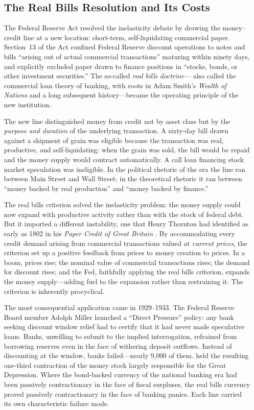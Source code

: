 \documentclass[12pt]{article}
\begin{document}
\subsection{The Real Bills Resolution and Its Costs}

The Federal Reserve Act resolved the inelasticity debate by drawing
the money--credit line at a new location: short-term, self-liquidating
commercial paper.  Section~13 of the Act confined Federal Reserve
discount operations to notes and bills ``arising out of actual
commercial transactions'' maturing within ninety days, and explicitly
excluded paper drawn to finance positions in ``stocks, bonds, or other
investment securities.''  The so-called \emph{real bills doctrine}---
also called the commercial loan theory of banking, with roots in Adam
Smith's \textit{Wealth of Nations} and a long subsequent
history---became the operating principle of the new institution.

The new line distinguished money from credit not by asset class but
by the \emph{purpose and duration} of the underlying transaction.  A
sixty-day bill drawn against a shipment of grain was eligible because
the transaction was real, productive, and self-liquidating: when the
grain was sold, the bill would be repaid and the money supply would
contract automatically.  A call loan financing stock market speculation
was ineligible.  In the political rhetoric of the era the line ran
between Main Street and Wall Street; in the theoretical rhetoric it
ran between ``money backed by real production'' and ``money backed
by finance.''

The real bills criterion solved the inelasticity problem: the money
supply could now expand with productive activity rather than with the
stock of federal debt.  But it imported a different instability, one
that Henry Thornton had identified as early as 1802 in his
\textit{Paper Credit of Great Britain} \citep{Thornton1802}.  By
accommodating every credit demand arising from commercial transactions
valued at \emph{current prices}, the criterion set up a positive
feedback from prices to money creation to prices.  In a boom, prices
rise; the nominal value of commercial transactions rises; the demand for
discount rises; and the Fed, faithfully applying the real bills
criterion, expands the money supply---adding fuel to the expansion
rather than restraining it.  The criterion is inherently procyclical.

The most consequential application came in 1929--1933.  The Federal
Reserve Board member Adolph Miller launched a ``Direct Pressure'' policy:
any bank seeking discount window relief had to certify that it had never
made speculative loans.  Banks, unwilling to submit to the implied
interrogation, refrained from borrowing reserves even in the face of
withering deposit outflows.  Instead of discounting at the window, banks
failed---nearly 9{,}000 of them.  \citet{FriedmanSchwartz1963} held
the resulting one-third contraction of the money stock largely
responsible for the Great Depression.  Where the bond-backed currency
of the national banking era had been passively contractionary in the
face of fiscal surpluses, the real bills currency proved passively
contractionary in the face of banking panics.  Each line carried its
own characteristic failure mode.
\end{document}
